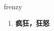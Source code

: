 
\begin{frame}
{\huge frenzy}
\begin{center}
\begin{enumerate}\Large
  \item \textbf{疯狂，狂怒}
\end{enumerate}
\end{center}
\end{frame}
